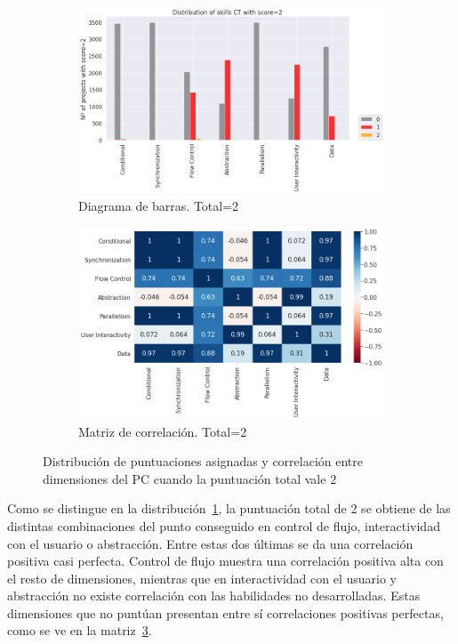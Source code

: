 \documentclass[a4paper, 12pt]{book}
\begin{document}
\begin{figure}[H]
    \centering
    \begin{subfigure}[h]{.49\textwidth} 
        \includegraphics[width=\textwidth]{img/distribucion_2_Snap}
        \caption{Diagrama de barras. Total=2}
        \label{fig:total2_Snap}
    \end{subfigure}       
    \begin{subfigure}[h]{.49\textwidth} 
        \includegraphics[width=\textwidth]{img/corr_2_Snap}
        \caption{Matriz de correlación. Total=2}
        \label{fig:corr2_Snap}
    \end{subfigure}
     \caption{Distribución de puntuaciones asignadas y correlación entre dimensiones del PC cuando la puntuación total vale 2}
\end{figure}

Como se distingue en la distribución~\ref{fig:total2_Snap}, la puntuación total de 2 se obtiene de las distintas combinaciones del punto conseguido en control de flujo, interactividad con el usuario o abstracción. Entre estas dos últimas se da una correlación positiva casi perfecta. Control de flujo muestra una correlación positiva alta con el resto de dimensiones, mientras que en interactividad con el usuario y abstracción no existe correlación con las habilidades no desarrolladas. Estas dimensiones que no puntúan presentan entre sí correlaciones positivas perfectas, como se ve en la matriz~\ref{fig:corr2_Snap}.
\end{document}
